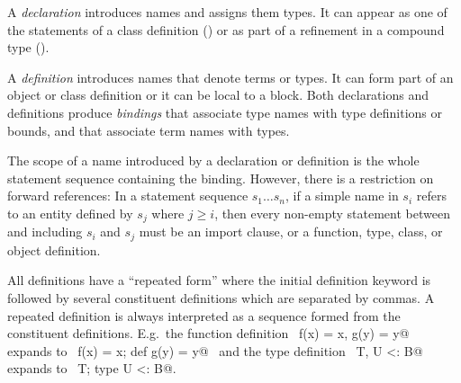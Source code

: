 \documentclass[a4paper,12pt,twoside,titlepage]{book}
\begin{document}
A {\em declaration} introduces names and assigns them types. It can
appear as one of the statements of a class definition
() or as part of a refinement in a compound
type ().

A {\em definition} introduces names that denote terms or types. It can
form part of an object or class definition or it can be local to a
block.  Both declarations and definitions produce {\em bindings} that
associate type names with type definitions or bounds, and that
associate term names with types.

The scope of a name introduced by a declaration or definition is the
whole statement sequence containing the binding.  However, there is a
restriction on forward references: In a statement sequence $s_1 \ldots
s_n$, if a simple name in $s_i$ refers to an entity defined by $s_j$
where $j \geq i$, then every non-empty statement between and including
$s_i$ and $s_j$ must be an import clause,
or a function, type, class, or object definition.


All definitions have a ``repeated form'' where the initial
definition keyword is followed by several constituent definitions
which are separated by commas.  A repeated definition is
always interpreted as a sequence formed from the
constituent definitions. E.g.\ the function definition
~\lstinline@def f(x) = x, g(y) = y@~ expands to
~\lstinline@def f(x) = x; def g(y) = y@~ and
the type definition
~\lstinline@type T, U <: B@~ expands to
~\lstinline@type T; type U <: B@.
\end{document}
